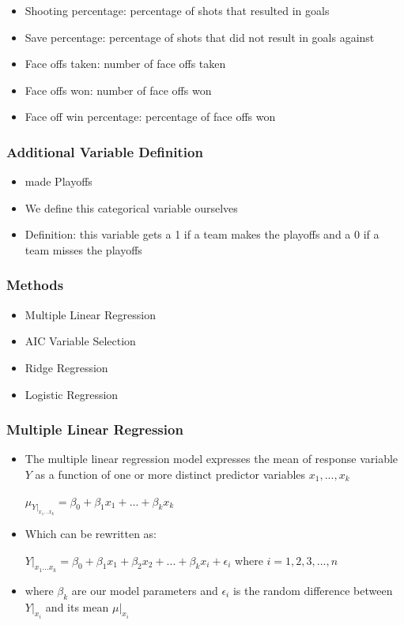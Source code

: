 \documentclass{beamer}
\begin{document}
\begin{frame}
	\begin{itemize}
		\item Shooting percentage: percentage of shots that resulted in goals
		\item Save percentage: percentage of shots that did not result in goals against
		\item Face offs taken: number of face offs taken 
		\item Face offs won: number of face offs won
		\item Face off win percentage: percentage of face offs won
	\end{itemize}
\end{frame}
\begin{frame}
	\frametitle{Additional Variable Definition}
	\begin{itemize}
		\item made Playoffs
		\item We define this categorical variable ourselves 
		\item Definition: this variable gets a 1 if a team makes the playoffs and a 0 if a team misses the playoffs
	\end{itemize}
\end{frame}
\begin{frame}
\frametitle{Methods}
	\begin{itemize}
		\item Multiple Linear Regression
		\item AIC Variable Selection
		\item Ridge Regression
		\item Logistic Regression
	\end{itemize}
\end{frame}
\begin{frame}
\frametitle{Multiple Linear Regression}
	\begin{itemize}
	\item The multiple linear regression model expresses the mean of response variable $Y$ as a function of one or more distinct predictor variables $x_1,...,x_k$
	\begin{center}
		$\mu_{Y|_{x_1...x_k}} = \beta_0 + \beta_1x_1 + ...+ \beta_kx_k$
	\end{center} 
	\item Which can be rewritten as: 
	\begin{center}
		$Y|_{x_1...x_k} = \beta_0 + \beta_1x_1 + \beta_2x_2 + ... + \beta_kx_i + \epsilon_i$ where $i = 1,2,3,...,n$
	\end{center} 
	\item where $\beta_k$ are our model parameters and $\epsilon_i$ is the random difference between $Y|_{x_i}$ and its mean $\mu|_{x_i}$
	\end{itemize}
\end{frame}
\end{document}
